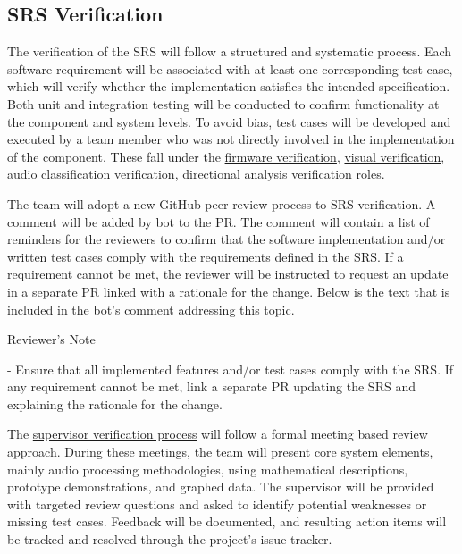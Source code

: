 \documentclass[12pt, titlepage]{article}
\newenvironment{shadedquotation}
    {\begin{shaded*}
     \quoting[leftmargin=0pt, vskip=0pt]}
    {\endquoting
     \end{shaded*}}
\begin{document}
\subsection{SRS Verification}\label{sec:srs_verification}

The verification of the SRS will follow a structured and systematic process.
Each software requirement will be associated with at least one corresponding
test case, which will verify whether the
implementation satisfies the intended specification. Both unit and integration
testing will be conducted to confirm functionality at the component and system
levels. To avoid bias, test cases will be developed and executed by a team
member who was not directly involved in the implementation of the component.
These fall under the
\hyperref[role:firmware_verfication]{firmware verification},
\hyperref[role:visual_vnv]{visual verification},
\hyperref[role:classification_verfication]{audio classification verification},
\hyperref[role:directional_verfication]{directional analysis verification}
roles. \newline

The team will adopt a new GitHub peer review process to SRS verification. A 
comment will be added by bot to the PR. The comment will contain a list of
reminders for the reviewers to confirm that the
software implementation and/or written test cases comply with the requirements
defined in the SRS. If a requirement cannot be met, the reviewer will be
instructed to request an update in a separate PR linked with a rationale for the
change. Below is the text that is included in the bot's comment addressing this
topic. \newline

\begin{shadedquotation}
Reviewer's Note

- Ensure that all implemented features and/or test cases comply with the SRS.
If any requirement cannot be met, link a separate PR updating the SRS and
explaining the rationale for the change.
\end{shadedquotation}

The 
\hyperref[role:audio_processing_verification]{supervisor verification process}
will follow a formal meeting based review approach. During these meetings,
the team will present core system elements, mainly audio processing
methodologies, using mathematical descriptions, prototype demonstrations,
and graphed data. The supervisor will be provided with targeted review
questions and asked to identify potential weaknesses or missing test cases.
Feedback will be documented, and resulting action items will be tracked
and resolved through the project's issue tracker. \newline
\end{document}
